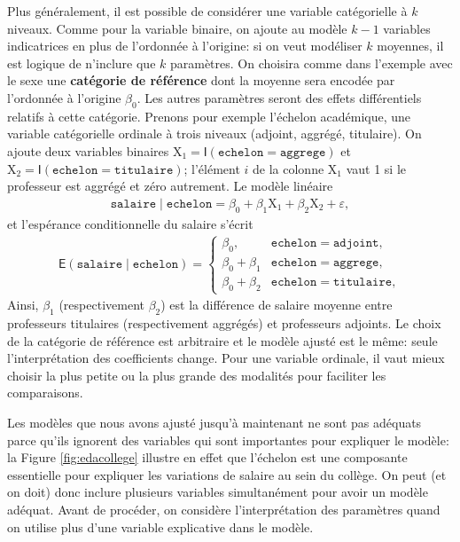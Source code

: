 \documentclass[
  11pt,
  letterpaper,
]{article}
\theoremstyle{definition}
\theoremstyle{definition}
\theoremstyle{definition}
\theoremstyle{remark}
\begin{document}
Plus généralement, il est possible de considérer une variable catégorielle à \(k\) niveaux. Comme pour la variable binaire, on ajoute au modèle \(k-1\) variables indicatrices en plus de l'ordonnée à l'origine: si on veut modéliser \(k\) moyennes, il est logique de n'inclure que \(k\) paramètres. On choisira comme dans l'exemple avec le sexe une \textbf{catégorie de référence} dont la moyenne sera encodée par l'ordonnée à l'origine \(\beta_0\). Les autres paramètres seront des effets différentiels relatifs à cette catégorie. Prenons pour exemple l'échelon académique, une variable catégorielle ordinale à trois niveaux (adjoint, aggrégé, titulaire). On ajoute deux variables binaires \(\mathrm{X}_1 = \mathsf{I}(\texttt{echelon}=\texttt{aggrege})\) et \(\mathrm{X}_2 = \mathsf{I}(\texttt{echelon}=\texttt{titulaire})\); l'élément \(i\) de la colonne \(\mathrm{X}_1\) vaut 1 si le professeur est aggrégé et zéro autrement. Le modèle linéaire
\begin{align*}
\texttt{salaire} \mid \texttt{echelon}=\beta_0 + \beta_1 \mathrm{X}_1+\beta_2\mathrm{X}_2 + \varepsilon,
\end{align*}
et l'espérance conditionnelle du salaire s'écrit
\begin{align*}
\mathsf{E}(\texttt{salaire} \mid \texttt{echelon})= \begin{cases}
\beta_0, & \texttt{echelon}=\texttt{adjoint},\\
\beta_0 + \beta_1 & \texttt{echelon}=\texttt{aggrege},\\
\beta_0 + \beta_2 & \texttt{echelon}=\texttt{titulaire},
\end{cases}
\end{align*}
Ainsi, \(\beta_1\) (respectivement \(\beta_2\)) est la différence de salaire moyenne entre professeurs titulaires (respectivement aggrégés) et professeurs adjoints.
Le choix de la catégorie de référence est arbitraire et le modèle ajusté est le même: seule l'interprétation des coefficients change. Pour une variable ordinale, il vaut mieux choisir la plus petite ou la plus grande des modalités pour faciliter les comparaisons.

Les modèles que nous avons ajusté jusqu'à maintenant ne sont pas adéquats parce qu'ils ignorent des variables qui sont importantes pour expliquer le modèle: la Figure \ref{fig:edacollege} illustre en effet que l'échelon est une composante essentielle pour expliquer les variations de salaire au sein du collège. On peut (et on doit) donc inclure plusieurs variables simultanément pour avoir un modèle adéquat. Avant de procéder, on considère l'interprétation des paramètres quand on utilise plus d'une variable explicative dans le modèle.
\end{document}
